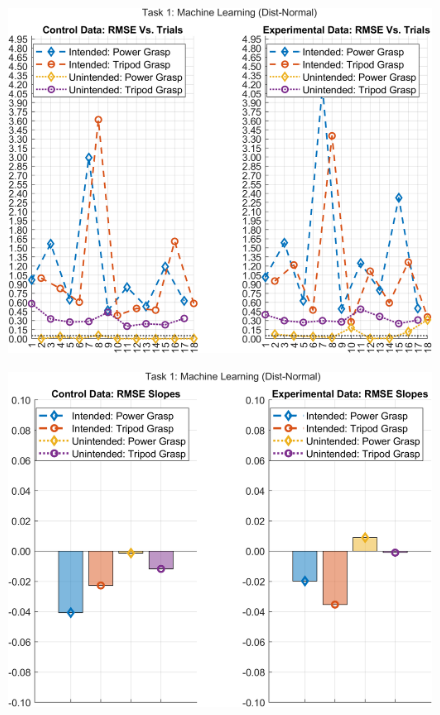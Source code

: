 \documentclass[12pt]{article}
\newcommand\figWidth{7in}
\begin{document}
\begin{figure}
    \includegraphics[width = \figWidth]{t1-rmse-dnorm.png}
\end{figure}
\begin{figure}
    \includegraphics[width = \figWidth]{t1-bar-dnorm.png}
\end{figure}
\end{document}
